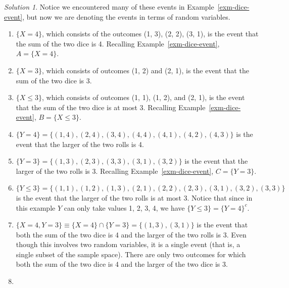 \documentclass[
  letterpaper,
  DIV=11,
  numbers=noendperiod]{scrreprt}
\providecommand{\tightlist}{%
  \setlength{\itemsep}{0pt}\setlength{\parskip}{0pt}}
\theoremstyle{plain}
\theoremstyle{definition}
\theoremstyle{definition}
\theoremstyle{definition}
\theoremstyle{remark}
\newtheorem{refsolution}{Solution}[chapter]
\begin{document}
\begin{tcolorbox}[enhanced jigsaw, opacityback=0, rightrule=.15mm, coltitle=black, colframe=quarto-callout-tip-color-frame, toprule=.15mm, colbacktitle=quarto-callout-tip-color!10!white, opacitybacktitle=0.6, left=2mm, toptitle=1mm, breakable, title={Solution (click to expand)}, bottomtitle=1mm, colback=white, leftrule=.75mm, titlerule=0mm, arc=.35mm, bottomrule=.15mm]

\begin{refsolution}
Notice we encountered many of these events in
Example~\ref{exm-dice-event}, but now we are denoting the events in
terms of random variables.

\begin{enumerate}
\def\labelenumi{\arabic{enumi}.}
\tightlist
\item
  \(\{X = 4\}\), which consists of the outcomes (1, 3), (2, 2), (3, 1),
  is the event that the sum of the two dice is 4. Recalling
  Example~\ref{exm-dice-event}, \(A = \{X = 4\}\).
\item
  \(\{X = 3\}\), which consists of outcomes (1, 2) and (2, 1), is the
  event that the sum of the two dice is 3.
\item
  \(\{X \le 3\}\), which consists of outcomes (1, 1), (1, 2), and (2,
  1), is the event that the sum of the two dice is at most 3. Recalling
  Example~\ref{exm-dice-event}, \(B = \{X \le 3\}\).
\item
  \(\{Y = 4\}=\{(1, 4), (2, 4), (3, 4), (4, 4), (4, 1), (4, 2), (4,3)\}\)
  is the event that the larger of the two rolls is 4.
\item
  \(\{Y = 3\}=\{(1, 3), (2, 3), (3, 3), (3, 1), (3, 2)\}\) is the event
  that the larger of the two rolls is 3. Recalling
  Example~\ref{exm-dice-event}, \(C = \{Y = 3\}\).
\item
  \(\{Y \le 3\}=\{(1, 1), (1, 2), (1, 3), (2, 1), (2, 2), (2, 3), (3, 1), (3, 2), (3, 3)\}\)
  is the event that the larger of the two rolls is at most 3. Notice
  that since in this example \(Y\) can only take values 1, 2, 3, 4, we
  have \(\{Y\le 3\} = \{Y=4\}^c\).
\item
  \(\{X = 4, Y = 3\} \equiv \{X = 4\}\cap \{Y = 3\}=\{(1, 3), (3, 1)\}\)
  is the event that both the sum of the two dice is 4 and the larger of
  the two rolls is 3. Even though this involves two random variables, it
  is a single event (that is, a single subset of the sample space).
  There are only two outcomes for which both the sum of the two dice is
  4 and the larger of the two dice is 3.
\item

\end{enumerate}
\end{refsolution}
\end{tcolorbox}
\end{document}
